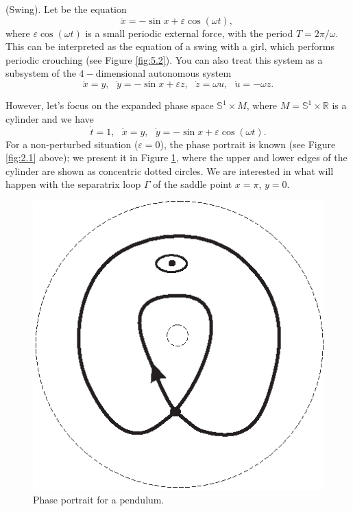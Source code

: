 \begin{example}(Swing).
	Let be the equation
	$$
	\ddot{x}=-\sin x+\varepsilon \cos (\omega t),\
	$$
	where $\varepsilon \cos \left( \omega t\right) $ is a small periodic external force, with the period $T=2\pi /\omega $. This can be interpreted as the equation of a swing with a girl, which performs periodic crouching (see Figure \ref{fig:5.2}). You can also treat this system as a subsystem of the $4-$dimensional autonomous system
	$$
	\dot{x}=y,\text{ \ }\dot{y}=-\sin x+\varepsilon z,\text{ \ }\dot{z}=\omega u, \text{ \ }\dot{u}=-\omega z.
	$$
	
	However, let's focus on the expanded phase space $\mathbb{S}^{1}\times M$, where $M=\mathbb{S}^{1}\times \mathbb{R}$ is a cylinder and we have
	\begin{equation}
	\label{5.2}
	\dot{t}=1,\text{ \ \ \ }\dot{x}=y,\text{ \ \ }\dot{y}=-\sin x+\varepsilon
	\cos (\omega t).
	\end{equation}
	For a non-perturbed situation ($\varepsilon =0$), the phase portrait is known (see Figure \ref{fig:2.1} above); we present it in Figure \ref{fig:5.3}, where the upper and lower edges of the cylinder are shown as concentric dotted circles. We are interested in what will happen with the separatrix loop $\Gamma$ of the saddle point $x=\pi$, $y=0$.
	
	\begin{figure}[!ht]
		\centering
		\includegraphics [scale=1.4]{jtr53}
		\caption{Phase portrait for a pendulum.}
		\label{fig:5.3}
	\end{figure}
	

\end{example}

